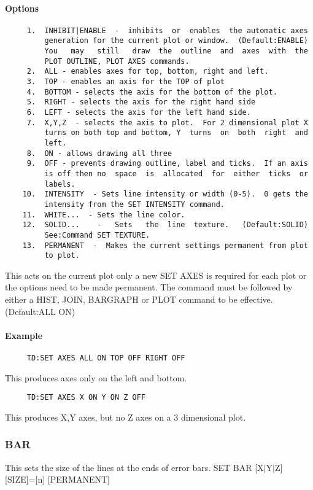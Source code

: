\paragraph{Options}
\begin{verbatim}
     1.  INHIBIT|ENABLE  -  inhibits  or  enables  the automatic axes
         generation for the current plot or window.  (Default:ENABLE)
         You   may   still   draw  the  outline  and  axes  with  the
         PLOT OUTLINE, PLOT AXES commands.  
     2.  ALL - enables axes for top, bottom, right and left.  
     3.  TOP - enables an axis for the TOP of plot 
     4.  BOTTOM - selects the axis for the bottom of the plot.  
     5.  RIGHT - selects the axis for the right hand side 
     6.  LEFT - selects the axis for the left hand side.  
     7.  X,Y,Z  - selects the axis to plot.  For 2 dimensional plot X
         turns on both top and bottom, Y  turns  on  both  right  and
         left.  
     8.  ON - allows drawing all three 
     9.  OFF - prevents drawing outline, label and ticks.  If an axis
         is off then no  space  is  allocated  for  either  ticks  or
         labels.  
    10.  INTENSITY  - Sets line intensity or width (0-5).  0 gets the
         intensity from the SET INTENSITY command.  
    11.  WHITE...  - Sets the line color.  
    12.  SOLID...    -   Sets   the  line  texture.   (Default:SOLID)
         See:Command SET TEXTURE.  
    13.  PERMANENT  -  Makes the current settings permanent from plot
         to plot.  
\end{verbatim}
This  acts  on  the  current plot only a new SET AXES is required for
each plot or the options need to be made permanent.  The command must
be  followed  by  either a HIST, JOIN, BARGRAPH or PLOT command to be
effective.  
(Default:ALL ON) 
\paragraph{Example}

\begin{verbatim}
     TD:SET AXES ALL ON TOP OFF RIGHT OFF 
\end{verbatim}
This produces axes only on the left and bottom.  

\begin{verbatim}
     TD:SET AXES X ON Y ON Z OFF 
\end{verbatim}
This produces X,Y axes, but no Z axes on a 3 dimensional plot.  
\subsubsection{BAR}
This sets the size of the lines at the ends of error bars.  
SET BAR [X$|$Y$|$Z] [SIZE]=[n] [PERMANENT] 

